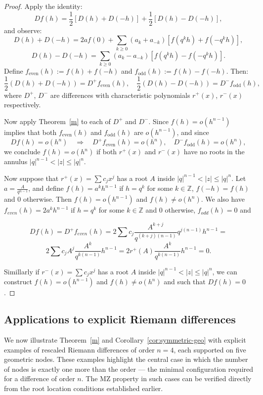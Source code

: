 \documentclass{raex}
\theoremstyle{definition}
\begin{document}
\begin{proof}
Apply the identity:
\[
Df(h) = \frac{1}{2} \left[ D(h) + D(-h) \right] + \frac{1}{2} \left[ D(h) - D(-h) \right],
\]
and observe:
\[
D(h) + D(-h) = 2a f(0) + \sum_{k \geq 0} (a_k + a_{-k}) \left[ f(q^k h) + f(-q^k h) \right],
\]
\[
D(h) - D(-h) = \sum_{k \geq 0} (a_k - a_{-k}) \left[ f(q^k h) - f(-q^k h) \right].
\]
Define \( f_{\mathrm{even}}(h) := f(h) + f(-h) \) and \( f_{\mathrm{odd}}(h) := f(h) - f(-h) \). Then:
\[
\frac{1}{2}(D(h) + D(-h)) = D^+f_{\mathrm{even}}(h), \quad \frac{1}{2}(D(h) - D(-h)) = D^- f_{\mathrm{odd}}(h),
\]
where \( D^+ \), \( D^- \) are differences with characteristic polynomials \( r^+(x) \), \( r^-(x) \) respectively.

Now apply Theorem~\ref{m} to each of \( D^+ \) and \( D^- \). Since \( f(h) = o(h^{n-1}) \) implies that both \( f_{\mathrm{even}}(h) \) and \( f_{\mathrm{odd}}(h) \) are \( o(h^{n-1}) \), and since
\[
Df(h) = o(h^n) \quad \Rightarrow \quad D^+ f_{\mathrm{even}}(h) = o(h^n), \quad D^- f_{\mathrm{odd}}(h) = o(h^n),
\]
we conclude \( f(h) = o(h^n) \)  if both \( r^+(x) \) and \( r^-(x) \) have no roots in the annulus \( |q|^{n-1} < |z| \leq |q|^n \).


Now suppose that $r^+(x)=\sum c_jx^j$ has a root $A$ inside \( |q|^{n-1} < |z| \leq |q|^n \). Let  $a=\frac{A}{q^{n-1}}$, and define $f(h)=a^kh^{n-1}$ if $h=q^k$ for some $k\in \mathbb{Z}$, $f(-h)=f(h)$ and 0 otherwise. Then $f(h)=o(h^{n-1})$ and $f(h) \neq o(h^n)$. We also have $f_{even}(h)=2a^kh^{n-1}$ if $h=q^k$ for some $k\in \mathbb{Z}$ and 0 otherwise, $f_{odd}(h)=0$ and 

\[Df(h)=D^+f_{even}(h)=2\sum c_j \frac{A^{k+j}}{q^{(k+j)(n-1)}}q^{j(n-1)}h^{n-1}=\]
\[2\sum c_j A^j\frac{A^k}{q^{k(n-1)}}h^{n-1}=2r^+(A)\frac{A^k}{q^{k(n-1)}}h^{n-1}=0.\]


 Simillarly if $r^-(x)=\sum c_jx^j$ has a root $A$ inside \( |q|^{n-1} < |z| \leq |q|^n \), we can construct $f(h)=o(h^{n-1})$ and $f(h) \neq o(h^n)$ and such that $Df(h)=0$.
\end{proof}

\subsection{Applications to explicit Riemann differences}

We now illustrate Theorem~\ref{m} and Corollary~\ref{cor:symmetric-geo} with explicit examples of rescaled Riemann differences of order \( n = 4 \), each supported on five geometric nodes. These examples highlight the central case in which the number of nodes is exactly one more than the order --- the minimal configuration required for a difference of order \( n \). The MZ property in such cases can be verified directly from the root location conditions established earlier.
\end{document}

